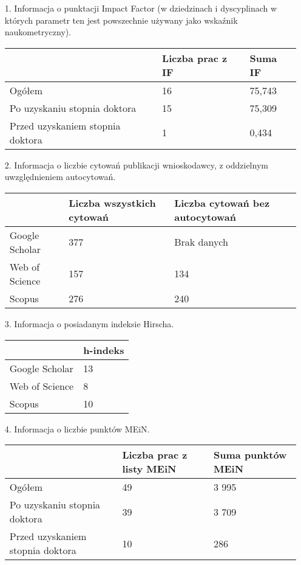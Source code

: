 		\begin{itemize}
		
			\item[1.] Informacja o punktacji Impact Factor (w dziedzinach i dyscyplinach w których parametr ten jest powszechnie używany jako wskaźnik naukometryczny).\vspace{-1em}	
			\begin{center}
				\begin{tabular}{p{18em}|p{7em}|p{7em}}
			& Liczba prac z IF & Suma IF\\\midrule
			Ogółem & 16 & 75,743\\%
			Po uzyskaniu stopnia doktora & 15 & 75,309\\%
			Przed uzyskaniem stopnia doktora & 1 & 0,434
				
				\end{tabular}	
			\end{center}
			
			\item[2.] Informacja o liczbie cytowań publikacji wnioskodawcy, z oddzielnym uwzględnieniem autocytowań.\vspace{-1em}
			\begin{center}
				\begin{tabular}{p{18em}|p{7em}|p{7em}}
			& Liczba wszystkich cytowań & Liczba cytowań bez autocytowań\\\midrule
			Google Scholar & 377 & Brak danych\\%
			Web of Science & 157 & 134\\%
			Scopus & 276 & 240
				
				\end{tabular}	
			\end{center}

			\item[3.] Informacja o posiadanym indeksie Hirscha.\vspace{-1em}
			\begin{center}
				\begin{tabular}{p{18em}|p{14em}}
			& h-indeks\\\midrule
			Google Scholar & 13\\%
			Web of Science & 8\\%
			Scopus & 10
				
				\end{tabular}	
			\end{center}
			
			\item[4.] Informacja o liczbie punktów MEiN.\vspace{-1em}			
			\begin{center}
				\begin{tabular}{p{18em}|p{7em}|p{7em}}
			& Liczba prac z listy MEiN & Suma punktów MEiN\\\midrule
			Ogółem & 49 & 3 995\\%
			Po uzyskaniu stopnia doktora & 39 & 3 709\\%
			Przed uzyskaniem stopnia doktora & 10 & 286
				\end{tabular}	
			\end{center}
			

\end{itemize}
